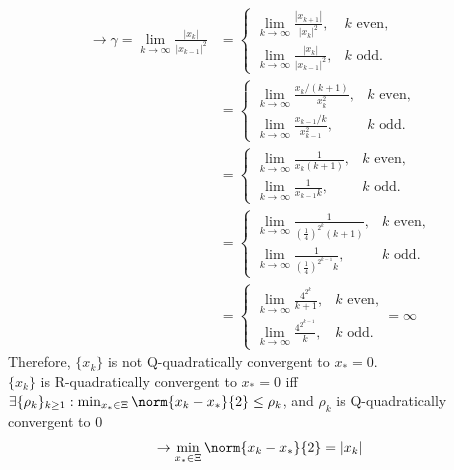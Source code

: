 \documentclass[11pt]{article}
\begin{document}
\begin{description}
\begin{description}
\begin{equation*}
\begin{aligned}
            \rightarrow\gamma=\lim_{k\rightarrow\infty}\frac{|x_k|}{|x_{k-1}|^2} &= \begin{cases}
                \lim_{k\rightarrow\infty}\frac{|x_{k+1}|}{|x_k|^2}, & k\text{ even,}\\
                \lim_{k\rightarrow\infty}\frac{|x_k|}{|x_{k-1}|^2}, & k\text{ odd.}
            \end{cases} \\
            &= \begin{cases}
                \lim_{k\rightarrow\infty}\frac{x_k/(k+1)}{x_k^2}, & k\text{ even,}\\
                \lim_{k\rightarrow\infty}\frac{x_{k-1}/k}{x_{k-1}^2}, & k\text{ odd.}
            \end{cases} \\
            &= \begin{cases}
                \lim_{k\rightarrow\infty}\frac{1}{x_k(k+1)}, & k\text{ even,}\\
                \lim_{k\rightarrow\infty}\frac{1}{x_{k-1}k}, & k\text{ odd.}
            \end{cases} \\
            &= \begin{cases}
                \lim_{k\rightarrow\infty}\frac{1}{(\frac{1}{4})^{2^k}(k+1)}, & k\text{ even,}\\
                \lim_{k\rightarrow\infty}\frac{1}{(\frac{1}{4})^{2^{k-1}}k}, & k\text{ odd.}
            \end{cases} \\
            &= \begin{cases}
                \lim_{k\rightarrow\infty}\frac{4^{2^k}}{k+1}, & k\text{ even,}\\
                \lim_{k\rightarrow\infty}\frac{4^{2^{k-1}}}{k}, & k\text{ odd.}
            \end{cases}
            = \infty
        \end{aligned}
    \end{equation*}
    Therefore, $\{x_k\}$ is not Q-quadratically convergent to $x_*=0$. \\
    $\{x_k\}$ is R-quadratically convergent to $x_*=0$
    iff $\exists\{\rho_k\}_{k\geq1}: \min_{x_*\in\Xi}\norm{x_k-x_*}{2}\leq\rho_k$, and $\rho_k$ is Q-quadratically convergent to 0
    \begin{equation*}
        \begin{aligned}
            \rightarrow\min_{x_*\in\Xi}\norm{x_k-x_*}{2} &= |x_k| \\

\end{aligned}
\end{equation*}
\end{description}
\end{description}
\end{document}
